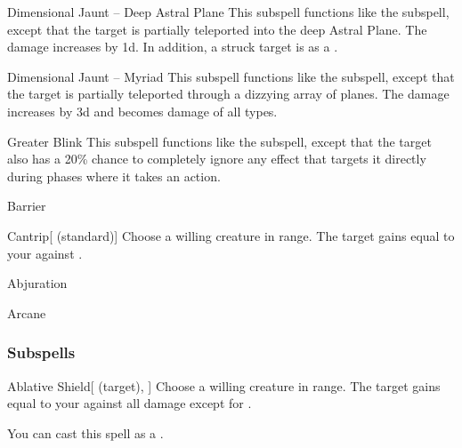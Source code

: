 \begin{ability}[\nth{5}]{Dimensional Jaunt -- Deep Astral Plane}
This subspell functions like the  subspell, except that the target is partially teleported into the deep Astral Plane.
The damage increases by \plus1d.
In addition, a struck target is  as a .
\end{ability}
\vspace{0.25em}


\begin{ability}[\nth{7}]{Dimensional Jaunt -- Myriad}
This subspell functions like the  subspell, except that the target is partially teleported through a dizzying array of planes.
The damage increases by \plus3d and becomes damage of all types.
\end{ability}
\vspace{0.25em}


\begin{ability}[\nth{7}]{Greater Blink}
This subspell functions like the  subspell, except that the target also has a 20\% chance to completely ignore any effect that targets it directly during phases where it takes an action.
\end{ability}
\vspace{0.25em}

\newpage
\begin{spellsection}{Barrier}

\begin{spellheader}
\end{spellheader}


\begin{ability}{Cantrip}[ (standard)]
Choose a willing creature in \rngclose range.
The target gains  equal to your  against .
\end{ability}




 Abjuration

 Arcane
\end{spellsection}


\subsubsection{Subspells}


\begin{ability}[\nth{1}]{Ablative Shield}[ (target), ]
Choose a willing creature in \rngclose range.
The target gains  equal to your  against all damage except for .

You can cast this spell as a .
\end{ability}
\vspace{0.25em}



